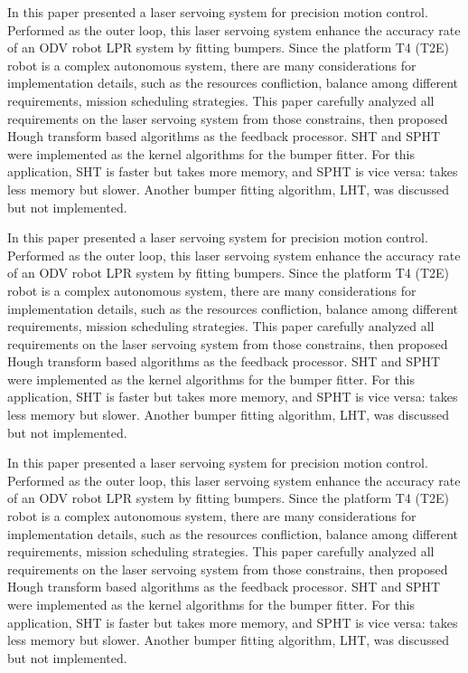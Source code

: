\documentclass{article}
\begin{document}
In this paper presented a laser servoing system for precision motion control. Performed as the outer loop, this laser servoing system enhance the accuracy rate of an ODV robot LPR system by fitting bumpers. Since the platform T4 (T2E) robot is a complex autonomous system, there are many considerations for implementation details, such as the resources confliction, balance among different requirements, mission scheduling strategies. This paper carefully analyzed all requirements on the laser servoing system from those constrains, then proposed Hough transform based algorithms as the feedback processor. SHT and SPHT were implemented as the kernel algorithms for the bumper fitter. For this application, SHT is faster but takes more memory, and SPHT is vice versa: takes less memory but slower. Another bumper fitting algorithm, LHT, was discussed but not implemented.


In this paper presented a laser servoing system for precision motion control. Performed as the outer loop, this laser servoing system enhance the accuracy rate of an ODV robot LPR system by fitting bumpers. Since the platform T4 (T2E) robot is a complex autonomous system, there are many considerations for implementation details, such as the resources confliction, balance among different requirements, mission scheduling strategies. This paper carefully analyzed all requirements on the laser servoing system from those constrains, then proposed Hough transform based algorithms as the feedback processor. SHT and SPHT were implemented as the kernel algorithms for the bumper fitter. For this application, SHT is faster but takes more memory, and SPHT is vice versa: takes less memory but slower. Another bumper fitting algorithm, LHT, was discussed but not implemented.


In this paper presented a laser servoing system for precision motion control. Performed as the outer loop, this laser servoing system enhance the accuracy rate of an ODV robot LPR system by fitting bumpers. Since the platform T4 (T2E) robot is a complex autonomous system, there are many considerations for implementation details, such as the resources confliction, balance among different requirements, mission scheduling strategies. This paper carefully analyzed all requirements on the laser servoing system from those constrains, then proposed Hough transform based algorithms as the feedback processor. SHT and SPHT were implemented as the kernel algorithms for the bumper fitter. For this application, SHT is faster but takes more memory, and SPHT is vice versa: takes less memory but slower. Another bumper fitting algorithm, LHT, was discussed but not implemented.
\end{document}

